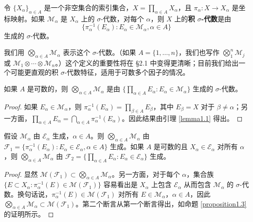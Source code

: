 \documentclass[lang=cn,10pt,thmcnt=section]{elegantbook}
\begin{document}
令 $\{X_\alpha\}_{\alpha\in A}$ 是一个非空集合的索引集合，$X = \prod_{\alpha\in A} X_\alpha$，且 $\pi_\alpha : X \to X_\alpha$ 是坐标映射。如果 $\mathcal{M}_\alpha$ 是 $X_\alpha$ 上的 $\sigma$-代数，对每个 $\alpha$，则 $X$ 上的\textbf{积 $\sigma$-代数}是由
\[\{\pi_\alpha^{-1}(E_\alpha) : E_\alpha \in \mathcal{M}_\alpha, \alpha \in A\}\]
生成的 $\sigma$-代数。

我们用 $\bigotimes_{\alpha\in A} \mathcal{M}_\alpha$ 表示这个 $\sigma$-代数。（如果 $A = \{1,\ldots,n\}$，我们也写作 $\bigotimes_{1}^{n} \mathcal{M}_j$ 或 $\mathcal{M}_1 \otimes \cdots \otimes \mathcal{M}_n$。）这个定义的重要性将在 \S2.1 中变得更清晰；目前我们给出一个可能更直观的积 $\sigma$-代数特征，适用于可数多个因子的情况。

\begin{proposition}\label{proposition1.3}
如果 $A$ 是可数的，则 $\bigotimes_{\alpha\in A} \mathcal{M}_\alpha$ 是由 $\{\prod_{\alpha\in A} E_\alpha : E_\alpha \in \mathcal{M}_\alpha\}$ 生成的 $\sigma$-代数。
\end{proposition}

\begin{proof}
如果 $E_\alpha \in \mathcal{M}_\alpha$，则 $\pi_\alpha^{-1}(E_\alpha) = \prod_{\beta\in A} E_\beta$，其中 $E_\beta = X$ 对于 $\beta \neq \alpha$；另一方面，$\prod_{\alpha\in A} E_\alpha = \bigcap_{\alpha\in A} \pi_\alpha^{-1}(E_\alpha)$。因此结果由引理 \ref{lemma1.1} 得出。
\end{proof}

\begin{proposition}\label{proposition1.4}
假设 $\mathcal{M}_\alpha$ 由 $\mathcal{E}_\alpha$ 生成，$\alpha \in A$。则 $\bigotimes_{\alpha\in A} \mathcal{M}_\alpha$ 由 $\mathcal{F}_1 = \{\pi_\alpha^{-1}(E_\alpha) : E_\alpha \in \mathcal{E}_\alpha, \alpha \in A\}$ 生成。如果 $A$ 是可数的且 $X_\alpha \in \mathcal{E}_\alpha$ 对所有 $\alpha$，则 $\bigotimes_{\alpha\in A} \mathcal{M}_\alpha$ 由 $\mathcal{F}_2 = \{\prod_{\alpha\in A} E_\alpha : E_\alpha \in \mathcal{E}_\alpha\}$ 生成。
\end{proposition}

\begin{proof}
显然 $\mathcal{M}(\mathcal{F}_1) \subset \bigotimes_{\alpha\in A} \mathcal{M}_\alpha$。另一方面，对于每个 $\alpha$，集合族 $\{E \subset X_\alpha : \pi_\alpha^{-1}(E) \in \mathcal{M}(\mathcal{F}_1)\}$ 容易看出是 $X_\alpha$ 上包含 $\mathcal{E}_\alpha$ 从而包含 $\mathcal{M}_\alpha$ 的 $\sigma$-代数。换句话说，$\pi_\alpha^{-1}(E) \in \mathcal{M}(\mathcal{F}_1)$ 对所有 $E \in \mathcal{M}_\alpha$，$\alpha \in A$，因此 $\bigotimes_{\alpha\in A} \mathcal{M}_\alpha \subset \mathcal{M}(\mathcal{F}_1)$。第二个断言从第一个断言得出，如命题 \ref{proposition1.3} 的证明所示。
\end{proof}
\end{document}
